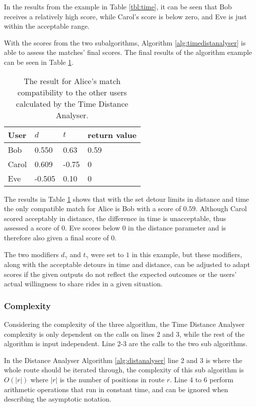 In the results from the example in Table \ref{tbl:time}, it can be seen that Bob receives a relatively high score, while Carol's score is below zero, and Eve is just within the acceptable range. 

With the scores from the two subalgorithms, Algorithm \ref{alg:timedistanalyser} is able to assess the matches' final scores.
The final results of the algorithm example can be seen in Table \ref{tbl:timedist}.

\begin{table}[!ht]
\centering
\begin{tabular}{@{}llll@{}}
\toprule
\textbf{User} 	& \textbf{$d$} & \textbf{$t$} 	& \textbf{return value} \\ \midrule
Bob         	& 0.550 	   & 0.63		    & 0.59					\\
Carol         	& 0.609        & -0.75	      	& 0       				\\
Eve           	& -0.505       & 0.10			& 0        				\\ \bottomrule
\end{tabular}
\caption{The result for Alice's match compatibility to the other users calculated by the Time Distance Analyser.}
\label{tbl:timedist}
\end{table}

The results in Table \ref{tbl:timedist} shows that with the set detour limits in distance and time the only compatible match for Alice is Bob with a score of $0.59$. 
Although Carol scored acceptably in distance, the difference in time is unacceptable, thus assessed a score of $0$.
Eve scores below 0 in the distance parameter and is therefore also given a final score of $0$.

The two modifiers $d_\gamma$ and $t_\gamma$ were set to $1$ in this example, but these modifiers, along with the acceptable detours in time and distance, can be adjusted to adapt scores if the given outputs do not reflect the expected outcomes or the users' actual willingness to share rides in a given situation. 

\subsubsection{Complexity}
Considering the complexity of the three algorithm, the Time Distance Analyser complexity is only dependent on the calls on lines 2 and 3, while the rest of the algorithm is input independent.
Line 2-3 are the calls to the two sub algorithms.

In the Distance Analyser Algorithm \ref{alg:distanalyser} line 2 and 3 is where the whole route should be iterated through, the complexity of this sub algorithm is $O(|r|)$ where $|r|$ is the number of positions in route $r$.
Line 4 to 6 perform arithmetic operations that run in constant time, and can be ignored when describing the asymptotic notation.

